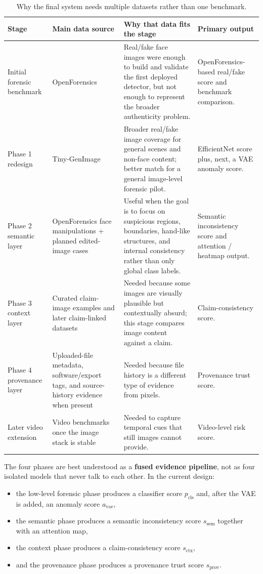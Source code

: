 \documentclass[11pt]{article}
\begin{document}
\begin{table}[H]
\centering
\small
\begin{tabularx}{0.98\textwidth}{>{\raggedright\arraybackslash}p{2.2cm} >{\raggedright\arraybackslash}p{3.5cm} >{\raggedright\arraybackslash}p{3.2cm} >{\raggedright\arraybackslash}X}
\toprule
\textbf{Stage} & \textbf{Main data source} & \textbf{Why that data fits the stage} & \textbf{Primary output}\\
\midrule
Initial forensic benchmark & OpenForensics & Real/fake face images were enough to build and validate the first deployed detector, but not enough to represent the broader authenticity problem. & OpenForensics-based real/fake score and benchmark comparison.\\
Phase 1 redesign & Tiny-GenImage & Broader real/fake image coverage for general scenes and non-face content; better match for a general image-level forensic pilot. & EfficientNet score plus, next, a VAE anomaly score.\\
Phase 2 semantic layer & OpenForensics face manipulations + planned edited-image cases & Useful when the goal is to focus on suspicious regions, boundaries, hand-like structures, and internal consistency rather than only global class labels. & Semantic inconsistency score and attention / heatmap output.\\
Phase 3 context layer & Curated claim-image examples and later claim-linked datasets & Needed because some images are visually plausible but contextually absurd; this stage compares image content against a claim. & Claim-consistency score.\\
Phase 4 provenance layer & Uploaded-file metadata, software/export tags, and source-history evidence when present & Needed because file history is a different type of evidence from pixels. & Provenance trust score.\\
Later video extension & Video benchmarks once the image stack is stable & Needed to capture temporal cues that still images cannot provide. & Video-level risk score.\\
\bottomrule
\end{tabularx}
\caption{Why the final system needs multiple datasets rather than one benchmark.}
\end{table}

The four phases are best understood as a \textbf{fused evidence pipeline}, not as four isolated models that never talk to each other. In the current design:
\begin{itemize}[leftmargin=1.5em]
    \item the low-level forensic phase produces a classifier score \(p_{\mathrm{cls}}\) and, after the VAE is added, an anomaly score \(a_{\mathrm{vae}}\),
    \item the semantic phase produces a semantic inconsistency score \(s_{\mathrm{sem}}\) together with an attention map,
    \item the context phase produces a claim-consistency score \(s_{\mathrm{ctx}}\),
    \item and the provenance phase produces a provenance trust score \(s_{\mathrm{prov}}\).
\end{itemize}
\end{document}
